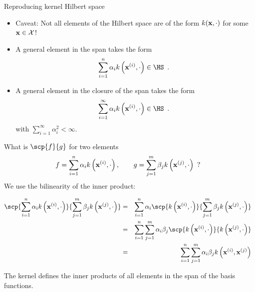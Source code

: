 \documentclass[11pt,compress,t,notes=noshow, xcolor=table]{beamer}
\begin{document}
\begin{vbframe}{Reproducing kernel Hilbert space}
\framebreak

  \begin{itemize}
    \item Caveat: Not all elements of the Hilbert space are of the
    form $k(\mathbf{x}, \cdot)$ for some $\mathbf{x} \in \mathcal{X}$!
    \item A general element in the span takes the form
    $$
    \sum_{i=1}^n \alpha_i k\left(\xi, \cdot\right) \in \HS
    \enspace.
    $$
    \item A general element in the closure of the span takes the form
    $$
    \sum_{i=1}^\infty \alpha_i k\left(\xi, \cdot\right) \in \HS
    \enspace.
    $$
    with $\sum_{i=1}^\infty \alpha_i^2 < \infty$.
  \end{itemize}

\framebreak

  What is $\scp{f}{g}$ for two elements
  $$
    f = \sum_{i=1}^n \alpha_i k\left(\mathbf{x}^{(i)}, \cdot\right), \qquad g = \sum_{j=1}^m \beta_j k\left(\mathbf{x}^{(j)}, \cdot\right)
    \enspace?
  $$
  We use the bilinearity of the inner product:
  \begin{small}
  \begin{eqnarray*}
    \scp{\sum_{i=1}^n \alpha_i k\left(\xi, \cdot\right)}{ \sum_{j=1}^m \beta_j k\left(\xv^{(j)}, \cdot\right)}
    &=& \sum_{i=1}^n \alpha_i \scp{k\left(\xi, \cdot\right)}{\sum_{j=1}^m \beta_j k\left(\xv^{(j)}, \cdot\right)} \\
    &=& \sum_{i=1}^n \sum_{j=1}^m \alpha_i \beta_j \scp{k\left(\xi, \cdot\right)}{k\left(\xv^{(j)}, \cdot\right)} \\
    &=& \sum_{i=1}^n \sum_{j=1}^m \alpha_i \beta_j k\left(\xi, \xv^{(j)}\right)
  \end{eqnarray*}
  \end{small}
  The kernel defines the inner products of all elements
  in the span of the basis functions.

\end{vbframe}
\end{document}
